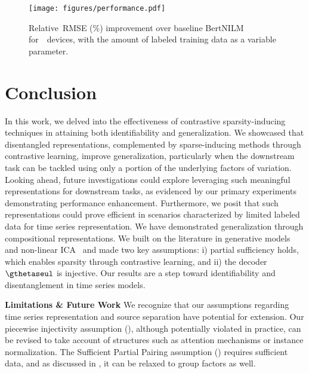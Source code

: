 \documentclass{article} %
\theoremstyle{plain}
\theoremstyle{definition}
\theoremstyle{remark}
\numberwithin{equation}{section}
\begin{document}
\begin{figure*}
    \centering
    \vspace{-0.30cm}
    \texttt{[image: figures/performance.pdf]}
    \vspace{-0.5cm}
    \caption{Relative~RMSE (\%) improvement over baseline BertNILM~\citealp{yue_bert4nilm_2020} for~\RealFactors~devices, with the amount of labeled training data as a variable parameter.}\label{fig:DIOSC_preserves_its_robustness}
    \vspace{-0.5cm}
\end{figure*}

\vspace{-0.2cm}
\section{Conclusion}
\vspace{-0.1cm}
In this work, we delved into the effectiveness of contrastive sparsity-inducing techniques in attaining both identifiability and generalization. We showcased that disentangled representations, complemented by sparse-inducing methods through contrastive learning, improve generalization, particularly when the downstream task can be tackled using only a portion of the underlying factors of variation. Looking ahead, future investigations could explore leveraging such meaningful representations for downstream tasks, as evidenced by our primary experiments demonstrating performance enhancement. Furthermore, we posit that such representations could prove efficient in scenarios characterized by limited labeled data for time series representation. We have demonstrated generalization through compositional representations. We built on the literature in generative models and non-linear ICA~\citep{kivva2022identifiability, hyvarinen2019nonlinear, lachapelle2022disentanglement} and made two key assumptions: i) partial sufficiency holds, which enables sparsity through contrastive learning, and ii) the decoder $\gthetaseul$ is injective. Our results are a step toward identifiability and disentanglement in time series models.


\textbf{Limitations \& Future Work}
We recognize that our assumptions regarding time series representation and source separation have potential for extension. Our piecewise injectivity assumption (), although potentially violated in practice, can be revised to take account of structures such as attention mechanisms or instance normalization. The Sufficient Partial Pairing assumption () requires sufficient data, and as discussed  in , it can be relaxed to group factors as well. 
\end{document}
